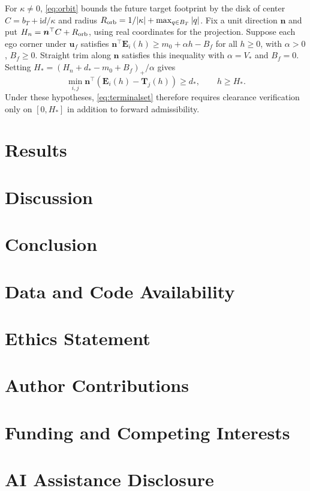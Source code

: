 \documentclass[journal]{IEEEtran}
\theoremstyle{definition}
\newcommand{\vct}[1]{\boldsymbol{#1}}
\begin{document}
For $\kappa\ne0$, \eqref{eq:orbit} bounds the future target footprint
by the disk of center $C=b_T+\mathrm i d/\kappa$ and radius
$R_{\rm orb}=1/|\kappa|+\max_{q\in B_T}|q|$. Fix a unit direction
$\vct n$ and put $H_n=\vct n^\top C+R_{\rm orb}$, using real
coordinates for the projection. Suppose each ego corner under $\vct u_f$
satisfies $\vct n^\top\vct E_i(h)\ge m_0+\alpha h-B_f$ for all
$h\ge0$, with $\alpha>0$, $B_f\ge0$. Straight trim along $\vct n$
satisfies this inequality with $\alpha=V_*$ and $B_f=0$. Setting
$H_*=(H_n+d_*-m_0+B_f)_+/\alpha$ gives
\begin{equation}\label{eq:cutoff}
 \min_{i,j}\vct n^\top(\vct E_i(h)-\vct T_j(h))\ge d_*,
 \qquad h\ge H_* .
\end{equation}
Under these hypotheses, \eqref{eq:terminalset} therefore requires
clearance verification only on $[0,H_*]$ in addition to forward
admissibility.

\section{Results}\label{sec:results}

\section{Discussion}\label{sec:discussion}

\section{Conclusion}\label{sec:conclusion}

\section*{Data and Code Availability}

\section*{Ethics Statement}

\section*{Author Contributions}

\section*{Funding and Competing Interests}

\section*{AI Assistance Disclosure}



\end{document}
